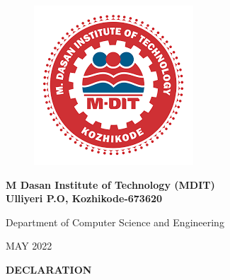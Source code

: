 \documentclass[12pt]{article}
\begin{document}
\begin{changemargin}{0.5cm}{0.5cm}
\begin{figure}[H]
\begin{center}
\includegraphics[scale=.5]{MDIT}
\end{center} 
\end{figure}
\vspace{0.001cm}
\thispagestyle{empty}
\begin{center}\large \bf{M Dasan Institute of Technology (MDIT) \\
Ulliyeri P.O, Kozhikode-673620} \end{center}
\vspace*{0.001cm}
\begin{center}Department of Computer Science and Engineering \end{center}
\vspace{0.001cm}
\begin{center}MAY 2022\end{center}

\newpage



\vspace*{30px}
\begin{center}\LARGE\bf{DECLARATION}\end{center}


\end{changemargin}
\end{document}
